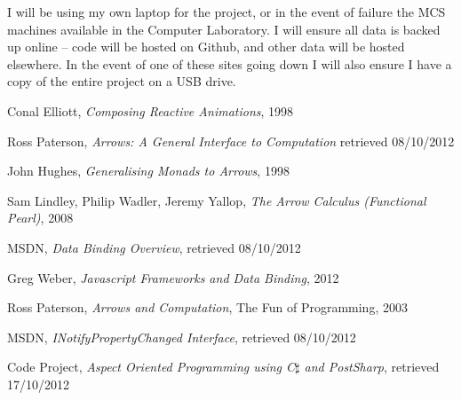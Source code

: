 	I will be using my own laptop for the project, or in the event of failure the MCS machines available in the Computer Laboratory. I will ensure all data is backed up online -- code will be hosted on Github, and other data will be hosted elsewhere. In the event of one of these sites going down I will also ensure I have a copy of the entire project on a USB drive.

\clearpage

\begin{thebibliography}{9}

	Conal Elliott,
	\emph{Composing Reactive Animations},
	1998
	
	Ross Paterson,
	\emph{Arrows: A General Interface to Computation}
	retrieved 08/10/2012
	
	John Hughes,
	\emph{Generalising Monads to Arrows},
	1998
	
	Sam Lindley, Philip Wadler, Jeremy Yallop,
	\emph{The Arrow Calculus (Functional Pearl)},
	2008
	
	MSDN,
	\emph{Data Binding Overview},
	retrieved 08/10/2012
	
	Greg Weber,
	\emph{Javascript Frameworks and Data Binding},
	2012
	
	Ross Paterson,
	\emph{Arrows and Computation},
	The Fun of Programming,
	2003
	
	MSDN,
	\emph{INotifyPropertyChanged Interface},
	retrieved 08/10/2012
	
	Code Project,
	\emph{Aspect Oriented Programming using C$\sharp$ and PostSharp},
	retrieved 17/10/2012

\end{thebibliography}

%